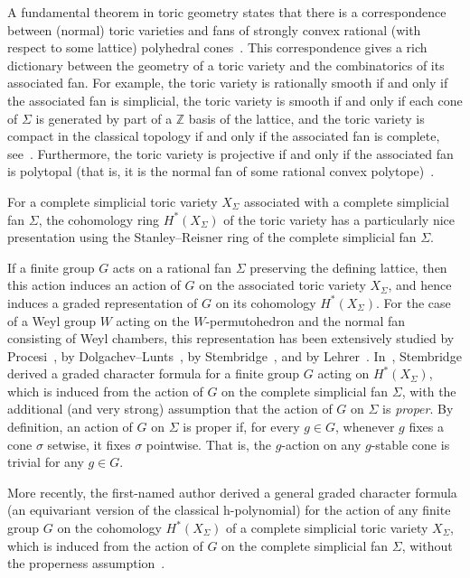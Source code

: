 \documentclass[12pt]{amsart}
\theoremstyle{remark}
\begin{document}
A fundamental theorem in toric geometry states that there is a correspondence between (normal) toric varieties and fans of strongly convex rational (with respect to some lattice) polyhedral cones~\cite{Fulton}. This correspondence gives a rich dictionary between the geometry of a toric variety and the combinatorics of its associated fan. For example, the toric variety is rationally smooth if and only if the associated fan is simplicial, the toric variety is smooth if and only if each cone of $\Sigma$ is generated by part of a $\mathbb{Z}$ basis of the lattice, and the toric variety is compact in the classical topology if and only if the associated fan is complete, see~\cite[Theorem 3.1.19]{CLS}. Furthermore, the toric variety is projective if and only if the associated fan is polytopal (that is, it is the normal fan of some rational convex polytope)~\cite[Theorem 6.2.1]{CLS}. 

For a complete simplicial toric variety $X_\Sigma$ associated with a complete simplicial fan $\Sigma$, the cohomology ring $H^{*}(X_\Sigma)$ of the toric variety has a particularly nice presentation using the Stanley--Reisner ring of the complete simplicial fan $\Sigma$. 

If a finite group $G$ acts on a rational fan $\Sigma$ preserving the defining lattice, then this action induces an action of $G$ on the associated toric variety $X_\Sigma$, and hence induces a graded representation of $G$ on its cohomology $H^{*}(X_\Sigma)$. For the case of a Weyl group $W$ acting on the $W$-permutohedron and the normal fan consisting of Weyl chambers, this representation has been extensively studied by Procesi~\cite{Procesi}, by Dolgachev--Lunts~\cite{DolgachevLunts}, by Stembridge~\cite{Stembridge}, and by Lehrer~\cite{Lehrer}. 
In~\cite[Theorem 1.4]{Stembridge}, Stembridge  derived a graded character formula for a finite group $G$ acting on $H^{*}(X_\Sigma)$, which is induced from the action of $G$ on the complete simplicial fan $\Sigma$, with the additional (and very strong) assumption that the action of $G$ on $\Sigma$ is \emph{proper}. By definition, an action of $G$ on $\Sigma$ is proper if, for every $g \in G$, whenever $g$ fixes a cone $\sigma$ setwise, it fixes $\sigma$ pointwise. That is, the $g$-action on
any $g$-stable cone is trivial for any $g\in G$.

More recently, the first-named author derived a general graded character formula (an equivariant version of the classical h-polynomial) for the action of any finite group $G$ on the cohomology $H^*(X_{\Sigma})$ of a complete simplicial toric variety $X_{\Sigma}$, which is induced from the action of $G$ on the complete simplicial fan $\Sigma$, without the properness assumption~\cite{Gui}.
\end{document}
